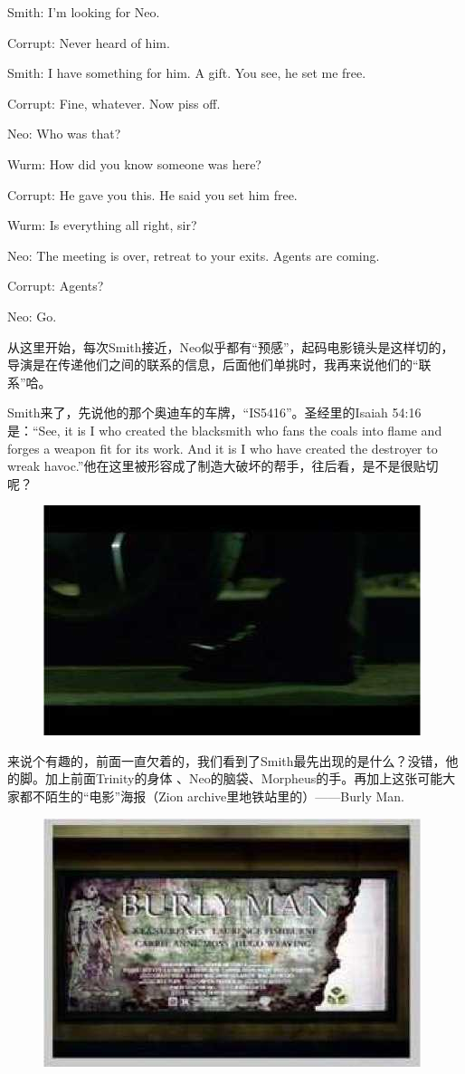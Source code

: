 \documentclass{ctexart}
\newenvironment{myquote}{\color{green} \setlength{\leftskip}{6em} \setlength{\rightskip}{4em} \setlength{\parindent}{-2em}}{\par}
\begin{document}
\begin{myquote}
Smith: I'm looking for Neo.

Corrupt: Never heard of him.

Smith: I have something for him. A gift. You see, he set me free.

Corrupt: Fine, whatever. Now piss off.

Neo: Who was that?

Wurm: How did you know someone was here?

Corrupt: He gave you this. He said you set him free.

Wurm: Is everything all right, sir?

Neo: The meeting is over, retreat to your exits. Agents are coming.

Corrupt: Agents?

Neo: Go.
\end{myquote}

从这里开始，每次Smith接近，Neo似乎都有“预感”，起码电影镜头是这样切的，导演是在传递他们之间的联系的信息，后面他们单挑时，我再来说他们的“联系”哈。

Smith来了，先说他的那个奥迪车的车牌，“IS5416”。圣经里的Isaiah 54:16是：“See, it is I who created the blacksmith who fans the coals into flame and forges a weapon fit for its work. And it is I who have created the destroyer to wreak havoc.”他在这里被形容成了制造大破坏的帮手，往后看，是不是很贴切呢？

\begin{figure}[htb]
\centering
\includegraphics[width=0.5\linewidth]{fig/read_reloaded-18}
\end{figure}

来说个有趣的，前面一直欠着的，我们看到了Smith最先出现的是什么？没错，他的脚。加上前面Trinity的身体 、Neo的脑袋、Morpheus的手。再加上这张可能大家都不陌生的“电影”海报（Zion archive里地铁站里的）——Burly Man.

\begin{figure}[htb]
\centering
\includegraphics[width=0.5\linewidth]{fig/read_reloaded-19}
\end{figure}
\end{document}
